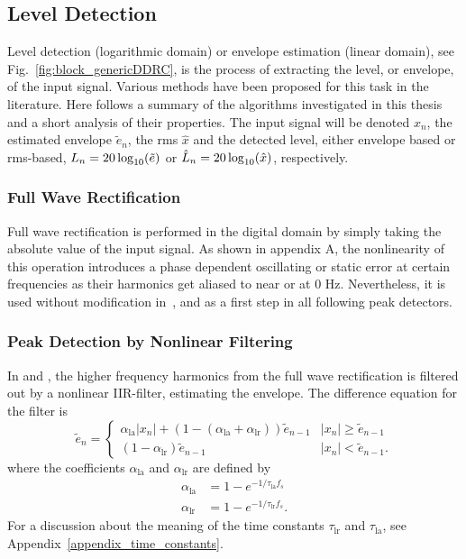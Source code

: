 \documentclass[../main2.tex]{subfiles}
\begin{document}
\subsection{Level Detection}\label{level_detection}
Level detection (logarithmic domain) or envelope estimation (linear domain), see Fig.~\ref{fig:block_genericDDRC}, is the process of extracting the level, or envelope, of the input signal. Various methods have been proposed for this task in the literature. Here follows a summary of the algorithms investigated in this thesis and a short analysis of their properties. The input signal will be denoted $x_n$, the estimated envelope $\tilde{e}_n$, the rms $\hat{x}$ and the detected level, either envelope based or rms-based, $L_n = 20\log_{10}(\tilde{e})$ or $\hat{L}_n=20\log_{10}(\hat{x})$, respectively. 

\subsubsection{Full Wave Rectification}\label{full_wave_rect}
Full wave rectification is performed in the digital domain by simply taking the absolute value of the input signal. As shown in appendix A, the nonlinearity of this operation introduces a phase dependent oscillating or static error at certain frequencies as their harmonics get aliased to near or at 0 Hz. Nevertheless, it is used without modification in~\cite{reiss2012tutorial}, and as a first step in all following peak detectors.

\subsubsection{Peak Detection by Nonlinear Filtering}\label{peak_detection}
In \cite{mcnally1984dynamic} and \cite{zolzer1997digital}, the higher frequency harmonics from the full wave rectification is filtered out by a nonlinear IIR-filter, estimating the envelope. The difference equation for the filter is
\begin{equation}\label{eq:analog_det}
\tilde{e}_n = \begin{cases}
    \alpha_\text{la} |x_n| + (1- (\alpha_\text{la} + \alpha_\text{lr})) \tilde{e}_{n-1}  	& |x_n| \geq \tilde{e}_{n-1} \\
    (1-\alpha_\text{lr}) \tilde{e}_{n-1} 							& |x_n| < \tilde{e}_{n-1}.
\end{cases}
\end{equation}
where the coefficients $\alpha_\text{la}$ and $\alpha_\text{lr}$ are defined by
\begin{align}
\alpha_\text{la} &= 1 - e^{-1/\tau_\text{la} f_s } \label{eq:attack_coeff_def}\\
\alpha_\text{lr} &= 1 - e^{-1/\tau_\text{lr} f_s } \label{eq:release_coeff_def}.
\end{align}
For a discussion about the meaning of the time constants $\tau_\text{lr}$ and $\tau_\text{la}$, see Appendix~\ref{appendix_time_constants}.
\end{document}
